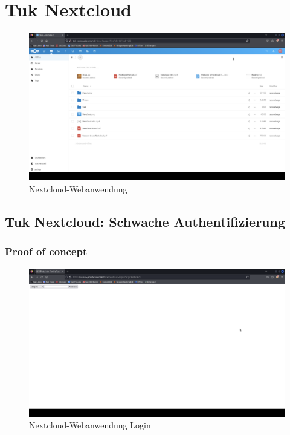 \pagebreak
\chapter{Tuk Nextcloud}\label{sec:nextcloud}

\begin{figure}[!ht]
    \centering
    \includegraphics[width=\linewidth]{images/screenshots/06_nextcloud_2.png}
    \caption{Nextcloud-Webanwendung}
    \label{fig:04_nextcloud}
\end{figure}
\newpage


\section{\makecvssbadge Tuk Nextcloud: Schwache Authentifizierung}

\subsection*{Proof of concept}

\begin{figure}[!ht]
    \centering
    \includegraphics[width=\linewidth]{images/screenshots/06_nextcloud.png}
    \caption{Nextcloud-Webanwendung Login}
    \label{fig:04_nextcloud_login}
\end{figure}


